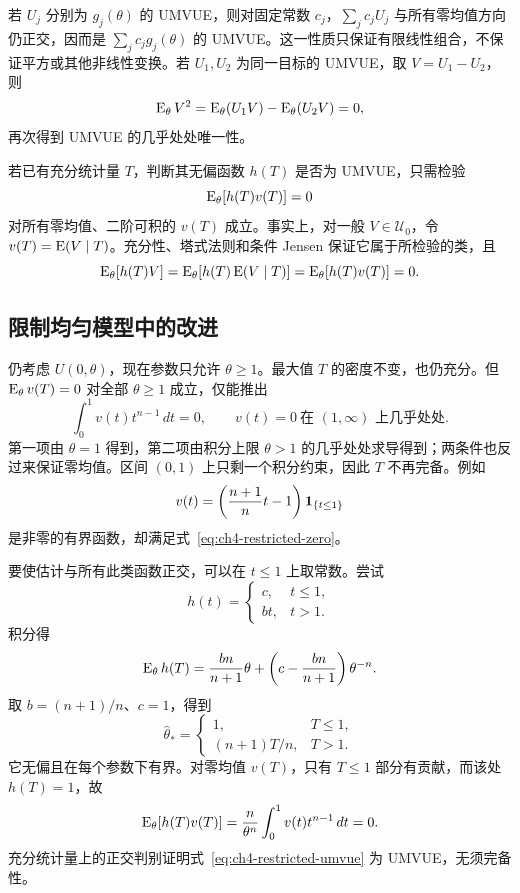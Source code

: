 若 $U_j$ 分别为 $g_j(\theta)$ 的 UMVUE，则对固定常数 $c_j$，$\sum_jc_jU_j$ 与所有零均值方向仍正交，因而是 $\sum_jc_jg_j(\theta)$ 的 UMVUE。这一性质只保证有限线性组合，不保证平方或其他非线性变换。若 $U_1,U_2$ 为同一目标的 UMVUE，取 $V=U_1-U_2$，则
\[
 \operatorname{E}_\theta V^2=\operatorname{E}_\theta(U_1V)-\operatorname{E}_\theta(U_2V)=0,
\]
再次得到 UMVUE 的几乎处处唯一性。

若已有充分统计量 $T$，判断其无偏函数 $h(T)$ 是否为 UMVUE，只需检验
\[
 \operatorname{E}_\theta[h(T)v(T)]=0
\]
对所有零均值、二阶可积的 $v(T)$ 成立。事实上，对一般 $V\in\mathcal U_0$，令 $v(T)=\operatorname{E}(V\mid T)$。充分性、塔式法则和条件 Jensen 保证它属于所检验的类，且
\[
 \operatorname{E}_\theta[h(T)V]
 =\operatorname{E}_\theta[h(T)\operatorname{E}(V\mid T)]
 =\operatorname{E}_\theta[h(T)v(T)]=0.
\]

\subsection{限制均匀模型中的改进}

仍考虑 $U(0,\theta)$，现在参数只允许 $\theta\geq1$。最大值 $T$ 的密度不变，也仍充分。但 $\operatorname{E}_\theta v(T)=0$ 对全部 $\theta\geq1$ 成立，仅能推出
\begin{equation}
 \int_0^1v(t)t^{n-1}\,dt=0,
 \qquad v(t)=0\ \text{在 }(1,\infty)\text{ 上几乎处处}.
 \label{eq:ch4-restricted-zero}
\end{equation}
第一项由 $\theta=1$ 得到，第二项由积分上限 $\theta>1$ 的几乎处处求导得到；两条件也反过来保证零均值。区间 $(0,1)$ 上只剩一个积分约束，因此 $T$ 不再完备。例如
\[
 v(t)=\left(\frac{n+1}{n}t-1\right)\mathbf 1_{\{t\leq1\}}
\]
是非零的有界函数，却满足式~\eqref{eq:ch4-restricted-zero}。

要使估计与所有此类函数正交，可以在 $t\leq1$ 上取常数。尝试
\[
 h(t)=\begin{cases}c,&t\leq1,\\bt,&t>1.\end{cases}
\]
积分得
\[
 \operatorname{E}_\theta h(T)=\frac{bn}{n+1}\theta
 +\left(c-\frac{bn}{n+1}\right)\theta^{-n}.
\]
取 $b=(n+1)/n$、$c=1$，得到
\begin{equation}
 \widehat\theta_*=\begin{cases}
 1,&T\leq1,\\
 (n+1)T/n,&T>1.
 \end{cases}
 \label{eq:ch4-restricted-umvue}
\end{equation}
它无偏且在每个参数下有界。对零均值 $v(T)$，只有 $T\leq1$ 部分有贡献，而该处 $h(T)=1$，故
\[
 \operatorname{E}_\theta[h(T)v(T)]
 =\frac n{\theta^n}\int_0^1v(t)t^{n-1}\,dt=0.
\]
充分统计量上的正交判别证明式~\eqref{eq:ch4-restricted-umvue} 为 UMVUE，无须完备性。

